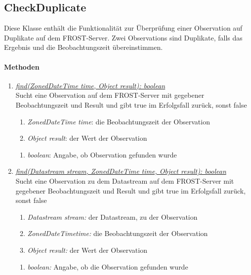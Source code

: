 \subsection{CheckDuplicate}

Diese Klasse enthält die Funktionalität zur Überprüfung einer Observation auf Duplikate auf dem FROST-Server.
Zwei Observations sind Duplikate, falls das Ergebnis und die Beobachtungszeit übereinstimmen.

\paragraph{Methoden}
	
\begin{enumerate}[+]
	
	\item \underline{\textit{find(ZonedDateTime time, Object result): boolean}}\\
	Sucht eine Observation auf dem FROST-Server mit gegebener Beobachtungszeit und Result und gibt true im Erfolgsfall zurück, sonst false
	\begin{enumerate}[$\bullet$]
		\item \textit{ZonedDateTime time}: die Beobachtungszeit der Observation
		\item \textit{Object result}: der Wert der Observation
	\end{enumerate}
	\vspace{-0.2cm}
	\begin{enumerate}[$\circ$]
		\item \textit{boolean}: Angabe, ob Observation gefunden wurde
	\end{enumerate}
	
	\item \underline{\textit{find(Datastream stream, ZonedDateTime time, Object result): boolean}} \\
	Sucht eine Observation zu dem Datastream auf dem FROST-Server mit gegebener Beobachtungszeit und Result und gibt true im Erfolgsfall zurück, sonst false
	\begin{enumerate}[$\bullet$]
		\item \textit{Datastream stream:} der Datastream, zu der Observation
		\item \textit{ZonedDateTimetime:} die Beobachtungszeit der Observation
		\item \textit{Object result:} der Wert der Observation
	\end{enumerate}
	\vspace{-0.2cm}
	\begin{enumerate}[$\circ$]
		\item \textit{boolean:} Angabe, ob die Observation gefunden wurde
	\end{enumerate}


\end{enumerate}
